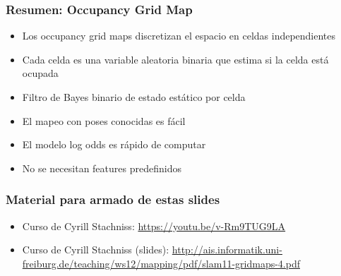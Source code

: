 \begin{frame}
    \frametitle{Resumen: Occupancy Grid Map}
    \begin{itemize}
        \item Los occupancy grid maps discretizan el espacio en celdas independientes
        \item Cada celda es una variable aleatoria binaria que estima si la celda está ocupada
        \item Filtro de Bayes binario de estado estático por celda
        \item El mapeo con poses conocidas es fácil
        \item El modelo log odds es rápido de computar
        \item No se necesitan features predefinidos
    \end{itemize}

\end{frame}


\begin{frame}
	\frametitle{Material para armado de estas slides}
    
    \begin{itemize}
	\item Curso de Cyrill Stachniss: \url{https://youtu.be/v-Rm9TUG9LA}

    \item Curso de Cyrill Stachniss (slides): \url{http://ais.informatik.uni-freiburg.de/teaching/ws12/mapping/pdf/slam11-gridmaps-4.pdf}
    \end{itemize}
\end{frame}
